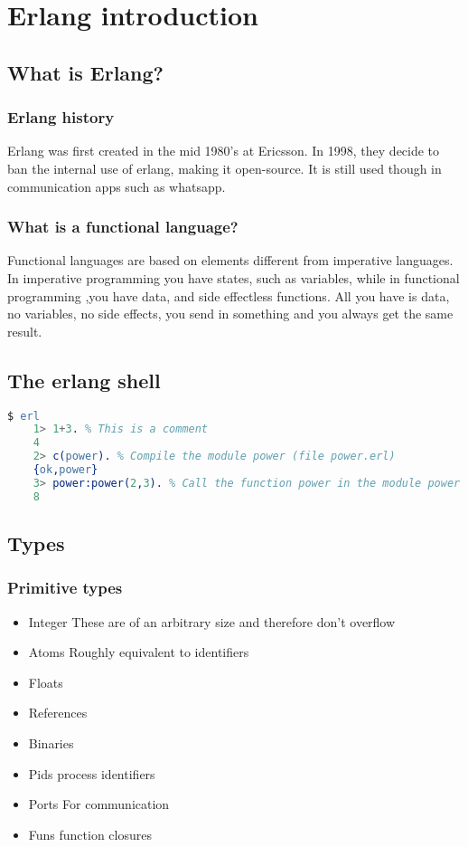 \chapter{Erlang introduction}
\section{What is Erlang?}
\subsection{Erlang history}
Erlang was first created in the mid 1980's at Ericsson. In 1998, they decide to ban the internal use of erlang, making it open-source. It is still used though in communication apps such as whatsapp.
\subsection{What is a functional language?}
Functional languages are based on elements different from imperative languages. In imperative programming you have states, such as variables, while in functional programming ,you have data, and side effectless functions.  All you have is data, no variables, no side effects, you send in something and you always get the same result.
\section{The erlang shell}
\begin{lstlisting}[language=erlang]
	$ erl
	1> 1+3.	% This is a comment
	4
	2> c(power). % Compile the module power (file power.erl)
	{ok,power}
	3> power:power(2,3). % Call the function power in the module power
	8
\end{lstlisting}
\section{Types}
\subsection{Primitive types}
\begin{itemize}
	\item Integer
	      \subitem These are of an arbitrary size and therefore don't overflow
	\item Atoms
	      \subitem Roughly equivalent to identifiers
	\item Floats
	\item References
	\item Binaries
	\item Pids
	      \subitem process identifiers
	\item Ports
	      \subitem For communication
	\item Funs
	      \subitem function closures
\end{itemize}
